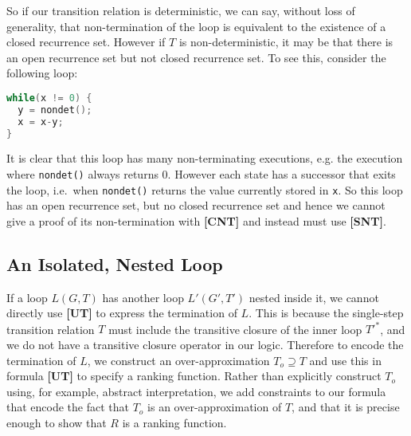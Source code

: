 \documentclass[preprint]{sigplanconf}
\theoremstyle{definition}
\begin{document}

So if our transition relation is deterministic, we can say, without
loss of generality, that non-termination of the loop is equivalent
to the existence of a closed recurrence set.  However if $T$ is
non-deterministic, it may be that there is an open recurrence
set but not closed recurrence set.  To see this, consider the following
loop:
%
\begin{lstlisting}[language=C]
while(x != 0) {
  y = nondet();
  x = x-y;
}
\end{lstlisting}

It is clear that this loop has many non-terminating executions,
e.g. the execution where \lstinline!nondet()! always returns 0.
However each state has a successor
that exits the loop, i.e.~when \lstinline|nondet()| returns
the value currently stored in \lstinline|x|.  So this loop
has an open recurrence set, but no closed recurrence set
and hence we cannot give a proof of its non-termination
with {\bf [CNT]} and instead must use {\bf [SNT]}.

% 

\subsection{An Isolated, Nested Loop}
 If a loop $L(G, T)$ has another loop $L'(G', T')$ nested inside it, we cannot directly use {\bf [UT]}
to express the termination of $L$.  This is because the single-step transition relation $T$ must
include the transitive closure of the inner loop $T'^*$, and we do not have a transitive closure
operator in our logic.  Therefore to encode the termination of $L$, we construct an over-approximation
$T_o \supseteq T$ and use this in formula {\bf [UT]} to specify a ranking function.
Rather than explicitly construct $T_o$ using, for example, abstract interpretation, we add constraints to
our formula that encode the fact that $T_o$ is an over-approximation of $T$, and that it is
precise enough to show that $R$ is a ranking function.
\end{document}
